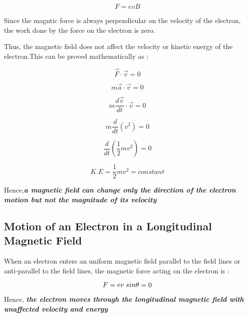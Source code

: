\documentclass[a4paper,20pt,twoside]{report}
\begin{document}
	\begin{equation}
	F = evB
	\end{equation}
	
	Since the magntic force is always perpendicular on the velocity of the electron, the work done by the force on the electron is zero.
	
	Thus, the magnetic field does not affect the velocity or kinetic energy of the electron.This can be proved mathematically as : 
	
	\begin{equation}
	\vec{F} \cdot \vec{v} = 0 
	\end{equation}
	
	\begin{equation}
	m\vec{a} \cdot  \vec{v} = 0
	\end{equation}
	
	\begin{equation}
	m\frac{d\vec{v}}{dt} \cdot \vec{v} = 0
	\end{equation}
	
	\begin{equation}
	m\frac{d}{dt}\left(v^2\right) = 0 
	\end{equation}
	
	\begin{equation}
	\frac{d}{dt}\left(\frac{1}{2}mv^2\right) = 0
	\end{equation}
	
	\begin{equation}
	K.E = \frac{1}{2}mv^2 = constant
	\end{equation}
	
	Hence,\textbf{\textit{a magnetic field can change only the direction of the electron motion but not the magnitude of its velocity}}
	
	\subsection{Motion of an Electron in a Longitudinal Magnetic Field}
	
	When an electron enters an uniform magnetic field parallel to the field lines or anti-parallel to the field lines, the magnetic force acting on the electron is : 
	
	\begin{equation}
	F = ev\hspace{1mm}sin\theta = 0
	\end{equation}
	
	Hence, \textbf{\textit{the electron moves through the longitudinal magnetic field with unaffected velocity and energy}}
	
\end{document}
